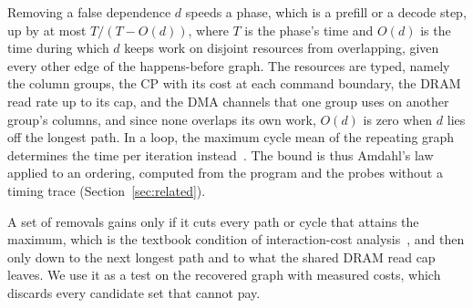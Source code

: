 Removing a false dependence $d$ speeds a phase, which is a prefill or a decode step, up by at most $T / (T - O(d))$, where $T$ is the phase's time and $O(d)$ is the time during which $d$ keeps work on disjoint resources from overlapping, given every other edge of the happens-before graph.
The resources are typed, namely the column groups, the CP with its cost at each command boundary, the DRAM read rate up to its cap, and the DMA channels that one group uses on another group's columns, and since none overlaps its own work, $O(d)$ is zero when $d$ lies off the longest path.
In a loop, the maximum cycle mean of the repeating graph determines the time per iteration instead~\citep{ghamarian2006throughput}.
The bound is thus Amdahl's law applied to an ordering, computed from the program and the probes without a timing trace (Section~\ref{sec:related}).

A set of removals gains only if it cuts every path or cycle that attains the maximum, which is the textbook condition of interaction-cost analysis~\citep{fields2003interaction}, and then only down to the next longest path and to what the shared DRAM read cap leaves.
We use it as a test on the recovered graph with measured costs, which discards every candidate set that cannot pay.

